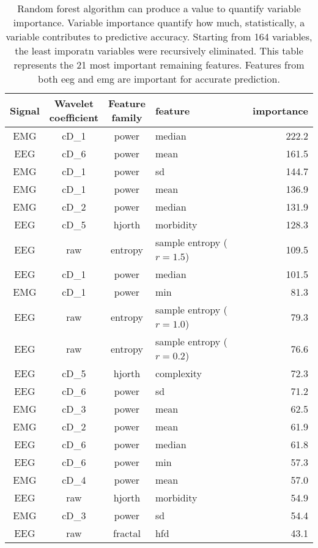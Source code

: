 \begin {table}[!h]
\begin{center}
\caption{
Random forest algorithm can produce a value to quantify variable importance.
Variable importance quantify how much, statistically, a variable contributes to predictive accuracy.
Starting from 164 variables, the least imporatn variables were recursively eliminated.
This table represents the 21 most important remaining features.
Features from both \gls{eeg} and \gls{emg} are important for accurate prediction.
\label{tab:importances}}

\small
\begin{tabular}{|c|c|c|l|r|}
  \hline
 Signal & \specialcell{Wavelet\\coefficient} & \specialcell{Feature\\family}  & feature & importance\\
\hline
\hline
EMG & cD\_1 & power & median & 222.2\\
EEG & cD\_6 & power & mean & 161.5\\
EMG & cD\_1 & power & sd &  144.7\\
EMG & cD\_1 & power & mean & 136.9\\
EMG & cD\_2 & power & median & 131.9\\
EEG & cD\_5 & hjorth & morbidity & 128.3\\
EEG & raw & entropy & sample entropy ($r=1.5$) & 109.5\\
EEG & cD\_1 & power & median & 101.5\\
EMG & cD\_1 & power & min & 81.3\\
EEG & raw & entropy & sample entropy ($r=1.0$) & 79.3\\
EEG & raw & entropy & sample entropy ($r=0.2$) & 76.6\\
EEG & cD\_5 & hjorth & complexity & 72.3\\
EEG & cD\_6 & power & sd & 71.2\\
EMG & cD\_3 & power & mean & 62.5\\
EMG & cD\_2 & power & mean & 61.9\\
EEG & cD\_6 & power & median & 61.8\\
EEG & cD\_6 & power & min & 57.3\\
EMG & cD\_4 & power & mean & 57.0\\
EEG & raw & hjorth & morbidity & 54.9\\
EMG & cD\_3 & power & sd & 54.4\\
EEG & raw & fractal & hfd & 43.1\\
\hline
 


\end{tabular}
\end{center}
\end{table}

